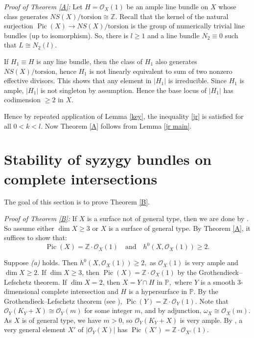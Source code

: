 \documentclass[11pt,letterpaper]{amsart}
\begin{document}
\textit{Proof of Theorem \ref{A}:} 
Let $H=\mathcal O_X(1)$ be an ample line bundle on $X$ whose class generates
$NS(X)/\mathrm{torsion}\cong\mathbb Z$. Recall that the kernel of the natural surjection $\operatorname{Pic}(X)\longrightarrow NS(X)/\mathrm{torsion}$
is the group of numerically trivial line bundles (up to isomorphism).
So, there is $l\ge1$ and a line bundle
$N_2\equiv0$ such that $L\cong N_2(l).$

If $H_1\equiv H$ is any line bundle, then the class of $H_1$ also generates
$NS(X)/\mathrm{torsion}$, hence $H_1$ is not linearly equivalent to sum of two nonzero effective divisors. This shows that any element in $|H_1|$ is irreducible. Since $H_1$ is ample, $|H_1|$ is not singleton by assumption. Hence the base locus of $|H_1|$ has codimension $\geq 2$ in $X$. 

Hence by repeated application of Lemma \ref{key}, the inequality \eqref{jr} is satisfied for all $0<k<l$. Now Theorem \ref{A} follows from Lemma \ref{jr main}.
\section{Stability of syzygy bundles on complete intersections}
The goal of this section is to prove Theorem \ref{B}.

\textit{Proof of Theorem \ref{B}:}
If $X$ is a surface not of general type, then we are done by
\cite[Theorem 1.4]{jiang2025stability}.
So assume either $\dim X\ge3$ or $X$ is a surface of general type.
By Theorem \ref{A}, it suffices to show that:
\[
\operatorname{Pic}(X)=\mathbb Z\cdot\mathcal O_X(1)
\quad\text{and}\quad
h^0(X,\mathcal O_X(1))\ge2.
\]

Suppose \emph{(a)} holds. Then $h^0(X,\mathcal O_X(1))\ge2,$
as $\mathcal O_X(1)$ is very ample and $\dim X\ge2$. If $\dim X\ge3$, then $\operatorname{Pic}(X)=\mathbb Z\cdot\mathcal O_X(1)$
by the Grothendieck--Lefschetz theorem. If $\dim X=2$, then $X=Y\cap H$ in $\mathbb P,$
where $Y$ is a smooth $3$-dimensional complete intersection and $H$ is a
hypersurface in $\mathbb P$. By the Grothendieck--Lefschetz theorem (see \cite[Section 3.1]{lazarsfeld2017positivity}), $\operatorname{Pic}(Y)=\mathbb Z\cdot\mathcal O_Y(1).$
Note that $\mathcal O_Y(K_Y+X)\cong\mathcal O_Y(m)$
for some integer $m$, and by adjunction, $\omega_X\cong \mathcal O_X(m).$
As $X$ is of general type, we have $m>0$, so
$\mathcal O_Y(K_Y+X)$ is very ample. By
\cite[Theorem 1]{ravindra2009noether}, a very general element
$X'$ of $|\mathcal O_Y(X)|$ has $\operatorname{Pic}(X')=\mathbb Z\cdot\mathcal O_{X'}(1).$
\end{document}
